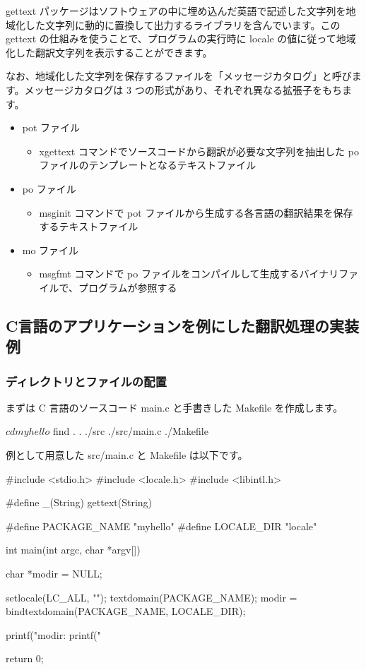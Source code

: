 \documentclass[mingoth,a4paper]{jsarticle}
\begin{document}
gettext パッケージはソフトウェアの中に埋め込んだ英語で記述した文字列を地域化した文字列に動的に置換して出力するライブラリを含んでいます。この gettext の仕組みを使うことで、プログラムの実行時に locale の値に従って地域化した翻訳文字列を表示することができます。


なお、地域化した文字列を保存するファイルを「メッセージカタログ」と呼びます。メッセージカタログは 3 つの形式があり、それぞれ異なる拡張子をもちます。

\begin{itemize}
\item pot ファイル
  \begin{itemize}
  \item xgettext コマンドでソースコードから翻訳が必要な文字列を抽出した po ファイルのテンプレートとなるテキストファイル
  \end{itemize}
\item po ファイル
  \begin{itemize}
  \item msginit コマンドで pot ファイルから生成する各言語の翻訳結果を保存するテキストファイル
  \end{itemize}
\item mo ファイル
  \begin{itemize}
  \item msgfmt コマンドで po ファイルをコンパイルして生成するバイナリファイルで、プログラムが参照する
  \end{itemize}
\end{itemize}


\subsection{C言語のアプリケーションを例にした翻訳処理の実装例}

\subsubsection{ディレクトリとファイルの配置}

まずは C 言語のソースコード main.c と手書きした Makefile を作成します。

\begin{commandline}
$ cd myhello
$ find .
.
./src
./src/main.c
./Makefile
\end{commandline}

例として用意した src/main.c と Makefile は以下です。

\begin{commandline}
#include <stdio.h>
#include <locale.h>
#include <libintl.h>

#define _(String) gettext(String)

#define PACKAGE_NAME "myhello"
#define LOCALE_DIR   "locale"

int main(int argc, char *argv[])
{
    char *modir = NULL;

    setlocale(LC_ALL, "");
    textdomain(PACKAGE_NAME);
    modir = bindtextdomain(PACKAGE_NAME, LOCALE_DIR);

    printf("modir: %
    printf("%

    return 0;
}
\end{commandline}
\end{document}
